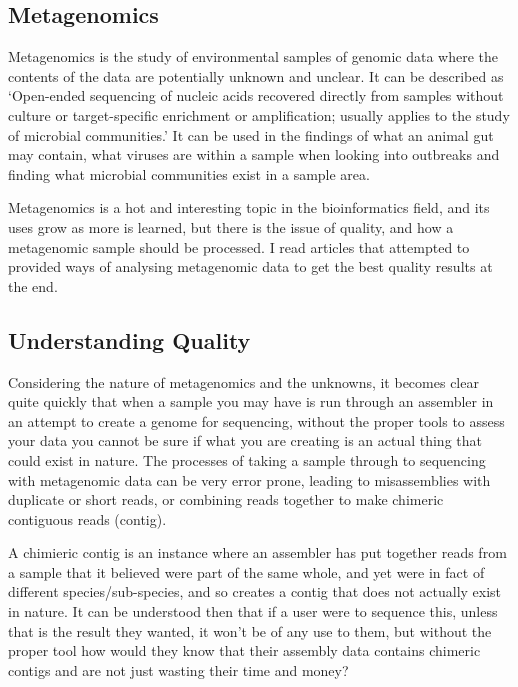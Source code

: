 \subsection{Metagenomics}
Metagenomics is the study of environmental samples of genomic data where the contents of the data are potentially unknown and unclear. It can be described as `Open-ended sequencing of nucleic acids recovered directly from samples without culture or target-specific enrichment or amplification; usually applies to the study of microbial communities.'\cite{citeulike:14021056} It can be used in the findings of what an animal gut may contain, what viruses are within a sample when looking into outbreaks and finding what microbial communities exist in a sample area.

Metagenomics is a hot and interesting topic in the bioinformatics field, and its uses grow as more is learned, but there is the issue of quality, and how a metagenomic sample should be processed. I read articles that attempted to provided ways of analysing metagenomic data to get the best quality results at the end.\cite{citeulike:11448654}

\subsection{Understanding Quality}

Considering the nature of metagenomics and the unknowns, it becomes clear quite quickly that when a sample you may have is run through an assembler in an attempt to create a genome for sequencing, without the proper tools to assess your data you cannot be sure if what you are creating is an actual thing that could exist in nature. The processes of taking a sample through to sequencing with metagenomic data can be very error prone, leading to misassemblies with duplicate or short reads, or combining reads together to make chimeric contiguous reads (contig).\cite{citeulike:3746363}

A chimieric contig is an instance where an assembler has put together reads from a sample that it believed were part of the same whole, and yet were in fact of different species/sub-species, and so creates a contig that does not actually exist in nature. It can be understood then that if a user were to sequence this, unless that is the result they wanted, it won't be of any use to them, but without the proper tool how would they know that their assembly data contains chimeric contigs and are not just wasting their time and money?

